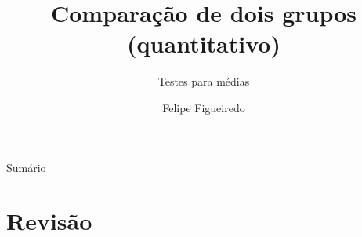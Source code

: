 \documentclass{beamer}
\title%
{Comparação de dois grupos (quantitativo)}
\subtitle
{Testes para médias} %
\author%
{Felipe Figueiredo}%
\institute[INTO] %
{Instituto Nacional de Traumatologia e Ortopedia
}
\date%
{}
\begin{document}
\begin{frame}
  \titlepage
\end{frame}

\begin{frame}{Sumário}
  \tableofcontents
\end{frame}








\section{Revisão}
\end{document}
